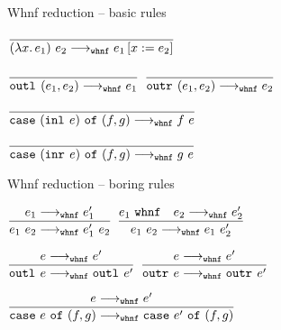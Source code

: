 \documentclass{beamer}
\begin{document}
\begin{frame}{Whnf reduction -- basic rules}

\begin{center}
  $\infrule{}{\smallstepwhnf{\app{(\fun{x}{e_1})}{e_2}}{\subst{e_1}{x}{e_2}}}$

  \vspace{2em}

  $\displaystyle \frac{}{\texttt{outl}_{}\ (e_1, e_2) \longrightarrow_{\texttt{whnf}} e_1} \textsc{\footnotesize{}}$ \quad
  $\displaystyle \frac{}{\texttt{outr}_{}\ (e_1, e_2) \longrightarrow_{\texttt{whnf}} e_2} \textsc{\footnotesize{}}$

  \vspace{2em}

  $\infrule{}{\smallstepwhnf{\case{(\inl{e})}{f}{g}}{\app{f}{e}}}$

  \vspace{2em}

  $\infrule{}{\smallstepwhnf{\case{(\inr{e})}{f}{g}}{\app{g}{e}}}$

\end{center}

\end{frame}

\begin{frame}{Whnf reduction -- boring rules}

\begin{center}
  $\infrule{\smallstepwhnf{e_1}{e_1'}}{\smallstepwhnf{\app{e_1}{e_2}}{\app{e_1'}{e_2}}}$ \quad
  $\infrule{\whnf{e_1} \quad \smallstepwhnf{e_2}{e_2'}}{\smallstepwhnf{\app{e_1}{e_2}}{\app{e_1}{e_2'}}}$

  \vspace{2em}

  $\displaystyle \frac{e \longrightarrow_{\texttt{whnf}} e'}{\texttt{outl}_{}\ e \longrightarrow_{\texttt{whnf}} \texttt{outl}_{}\ e'} \textsc{\footnotesize{}}$ \quad
  $\displaystyle \frac{e \longrightarrow_{\texttt{whnf}} e'}{\texttt{outr}_{}\ e \longrightarrow_{\texttt{whnf}} \texttt{outr}_{}\ e'} \textsc{\footnotesize{}}$

  \vspace{2em}

  $\displaystyle \frac{e \longrightarrow_{\texttt{whnf}} e'}{\texttt{case}\ e\ \texttt{of}\ (f, g) \longrightarrow_{\texttt{whnf}} \texttt{case}\ e'\ \texttt{of}\ (f, g)} \textsc{\footnotesize{}}$

\end{center}

\end{frame}

\end{document}
